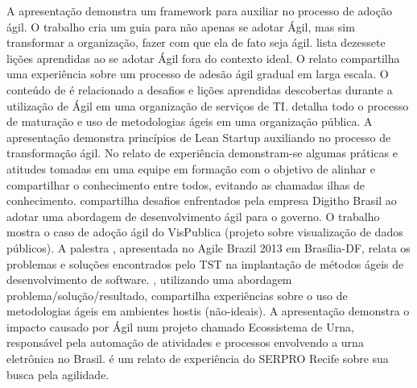 A apresentação\cite{Ahmed2008} demonstra um framework para auxiliar no processo de adoção ágil. O trabalho \cite{Sahota2012} cria um guia para não apenas se adotar Ágil, mas sim transformar a organização, fazer com que ela de fato seja ágil. \cite{Piegas2012} lista dezessete lições aprendidas ao se adotar Ágil fora do contexto ideal. O relato \cite{Parzinello2012} compartilha uma experiência sobre um processo de adesão ágil gradual em larga escala. O conteúdo de \cite{Srinath2012} é relacionado a desafios e lições aprendidas descobertas durante a utilização de Ágil em uma organização de serviços de TI. \cite{Karaj2013} detalha todo o processo de maturação e uso de metodologias ágeis em uma organização pública. A apresentação \cite{Hui2013} demonstra princípios de Lean Startup auxiliando no processo de transformação ágil. No relato de experiência \cite{Valerio2013} demonstram-se algumas práticas e atitudes tomadas em uma equipe em formação com o objetivo de alinhar e compartilhar o conhecimento entre todos, evitando as chamadas ilhas de conhecimento. \cite{Stefano2013} compartilha desafios enfrentados pela empresa Digitho Brasil ao adotar uma abordagem de desenvolvimento ágil para o governo. O trabalho \cite{Rodrigues2013} mostra o caso de adoção ágil do VisPublica (projeto sobre visualização de dados públicos). A palestra \cite{Vieira2013}, apresentada no Agile Brazil 2013 em Brasília-DF, relata os problemas e soluções encontrados pelo TST na implantação de métodos ágeis de desenvolvimento de software. \cite{Queiroz2013}, utilizando uma abordagem problema/solução/resultado, compartilha experiências sobre o uso de metodologias ágeis em ambientes hostis (não-ideais). A apresentação \cite{Bastos2013} demonstra o impacto causado por Ágil num projeto chamado Ecossistema de Urna, responsável pela automação de atividades e processos envolvendo a urna eletrônica no Brasil. \cite{Maciel2013} é um relato de experiência do SERPRO Recife sobre sua busca pela agilidade.

%
